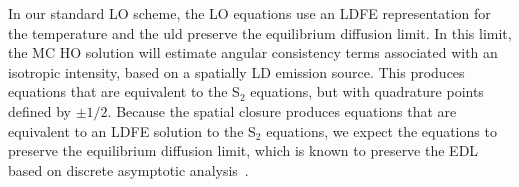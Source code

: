 In our standard LO scheme, the
LO equations use an LDFE representation for the temperature and the uld preserve the equilibrium diffusion limit.  In this limit, the MC HO
solution will estimate angular consistency terms associated with an isotropic intensity,
based on a spatially LD emission source.  This produces equations that are equivalent to
the S$_2$ equations, but with quadrature points defined by $\pm 1/2$.  Because the spatial closure produces equations that are equivalent to an LDFE
solution to the S$_2$ equations, we expect the equations to preserve the equilibrium diffusion
limit, which is known to preserve the EDL based on discrete asymptotic analysis~\cite{morel_ldtrt}.


